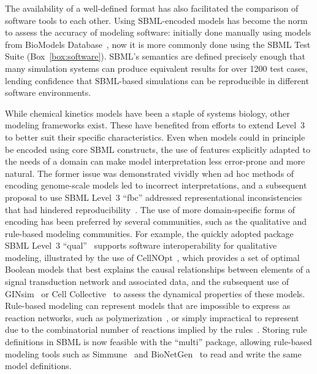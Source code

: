 \documentclass{sbml-paper}
\begin{document}
The availability of a well-defined format has also facilitated the comparison of software tools to each other.  Using SBML-encoded models has become the norm to assess the accuracy of modeling software: initially done manually using models from BioModels Database~\citep{bergmann2008comparing}, now it is more commonly done using the SBML Test Suite (Box~\ref{box:software}).  SBML's semantics are defined precisely enough that many simulation systems can produce equivalent results for over 1200 test cases, lending confidence that SBML-based simulations can be reproducible in different software environments.

While chemical kinetics models have been a staple of systems biology, other modeling frameworks exist.  These have benefited from efforts to extend Level~3 to better suit their specific characteristics.  Even when models could in principle be encoded using core SBML constructs, the use of features explicitly adapted to the needs of a domain can make model interpretation less error-prone and more natural.  The former issue was demonstrated vividly when ad hoc methods of encoding genome-scale models led to incorrect interpretations, and a subsequent proposal to use SBML Level~3 ``fbc'' addressed representational inconsistencies that had hindered reproducibility~\citep{Ebrahim2015}.  The use of more domain-specific forms of encoding has been preferred by several communities, such as the qualitative and rule-based modeling communities.  For example, the quickly adopted package SBML Level~3 ``qual''~\citep{Chaouiya2015sbml} supports software interoperability for qualitative modeling, illustrated by the use of CellNOpt~\citep{terfve2012cellnoptr}, which provides a set of optimal Boolean models that best explains the causal relationships between elements of a signal transduction network and associated data, and the subsequent use of GINsim~\citep{chaouiya2012logical} or Cell Collective~\citep{helikar2012cell} to assess the dynamical properties of these models.  Rule-based modeling can represent models that are impossible to express as reaction networks, such as polymerization~\citep{faeder2009rule}, or simply impractical to represent due to the combinatorial number of reactions implied by the rules~\citep{Hlavacek2003complexity}.  Storing rule definitions in SBML is now feasible with the ``multi'' package, allowing rule-based modeling tools such as Simmune~\citep{zhang2013simmune} and BioNetGen~\citep{faeder2009rule} to read and write the same model definitions.  %
\end{document}
